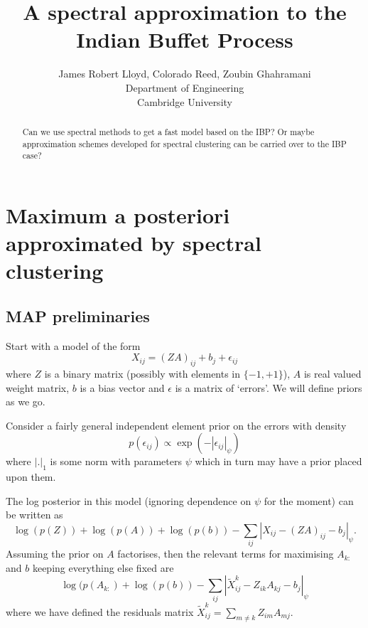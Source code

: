 \documentclass{article}
\title{
A spectral approximation to the Indian Buffet Process
}
\author{
James Robert Lloyd, Colorado Reed, Zoubin Ghahramani\\
Department of Engineering\\
Cambridge University\\
}
\numberwithin{equation}{section}
\numberwithin{thm}{section}
\def\IBP{Z}
\def\Weights{A}
\def\Data{X}
\def\Residuals{\tilde{X}}
\def\errors{\epsilon}
\def\bias{b}
\begin{document}
\maketitle

\begin{abstract}
Can we use spectral methods to get a fast model based on the IBP?
Or maybe approximation schemes developed for spectral clustering can be carried over to the IBP case?
\end{abstract}

\section{Maximum a posteriori approximated by spectral clustering}

\subsection{MAP preliminaries}

Start with a model of the form
\begin{equation}
\Data_{ij} = (\IBP\Weights)_{ij} + \bias_{j} + \errors_{ij}
\end{equation}
where $\IBP$ is a binary matrix (possibly with elements in $\{-1,+1\}$), $\Weights$ is real valued weight matrix, $\bias$ is a bias vector and $\epsilon$ is a matrix of `errors'.
We will define priors as we go.

Consider a fairly general independent element prior on the errors with density
\begin{equation}
p(\errors_{ij}) \propto \exp(-|\errors_{ij}|_\psi)
\end{equation}
where $|.|_1$ is some norm with parameters $\psi$ which in turn may have a prior placed upon them.

The log posterior in this model (ignoring dependence on $\psi$ for the moment) can be written as
\begin{equation}
\log(p(\IBP)) + \log(p(\Weights)) + \log(p(\bias)) - \sum_{ij}|\Data_{ij} - (\IBP\Weights)_{ij} - \bias_j|_\psi.
\end{equation}
Assuming the prior on $\Weights$ factorises, then the relevant terms for maximising $\Weights_{k:}$ and $\bias$ keeping everything else fixed are
\begin{equation}
\log(p(\Weights_{k:}) + \log(p(\bias)) - \sum_{ij} |\Residuals^k_{ij} - \IBP_{ik}\Weights_{kj} - \bias_j|_\psi
\end{equation}
where we have defined the residuals matrix $\Residuals^k_{ij} = \sum_{m \neq k}\IBP_{im}\Weights_{mj}$.
\end{document}
